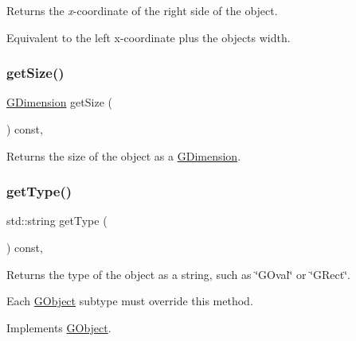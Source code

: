 Returns the {\itshape x}-\/coordinate of the right side of the object. 

Equivalent to the left x-\/coordinate plus the object\textquotesingle{}s width. \mbox{\label{classsgl_1_1GObject_a7b4eec96a2bdc6420695d5796a78eea9}} 
\subsubsection{\texorpdfstring{get\+Size()}{getSize()}}
{\footnotesize\ttfamily \mbox{\hyperlink{structsgl_1_1GDimension}{G\+Dimension}} get\+Size (\begin{DoxyParamCaption}{ }\end{DoxyParamCaption}) const\hspace{0.3cm}{\ttfamily [virtual]}, {\ttfamily [inherited]}}



Returns the size of the object as a {\ttfamily \mbox{\hyperlink{structsgl_1_1GDimension}{G\+Dimension}}}. 

\mbox{\label{classsgl_1_1GOval_a9b72ede4ee8520f987a0c01e30654814}} 
\subsubsection{\texorpdfstring{get\+Type()}{getType()}}
{\footnotesize\ttfamily std\+::string get\+Type (\begin{DoxyParamCaption}{ }\end{DoxyParamCaption}) const\hspace{0.3cm}{\ttfamily [override]}, {\ttfamily [virtual]}}



Returns the type of the object as a string, such as {\ttfamily \char`\"{}\+G\+Oval\char`\"{}} or {\ttfamily \char`\"{}\+G\+Rect\char`\"{}}. 

Each \mbox{\hyperlink{classsgl_1_1GObject}{G\+Object}} subtype must override this method. 

Implements \mbox{\hyperlink{classsgl_1_1GObject_a799e073a127b428cc841086d42ea4fed}{G\+Object}}.

\mbox{\label{classsgl_1_1GObject_a0ed2965abd4f5701d2cadf71239faf19}} 
